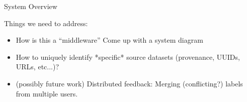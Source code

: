 System Overview


Things we need to address:
\begin{itemize}
  \item How is this a ``middleware''  Come up with a system diagram
  \item How to uniquely identify *specific* source datasets (provenance, UUIDs, URLs, etc...)?
  \item (possibly future work) Distributed feedback: Merging (conflicting?) labels from multiple users.
\end{itemize}